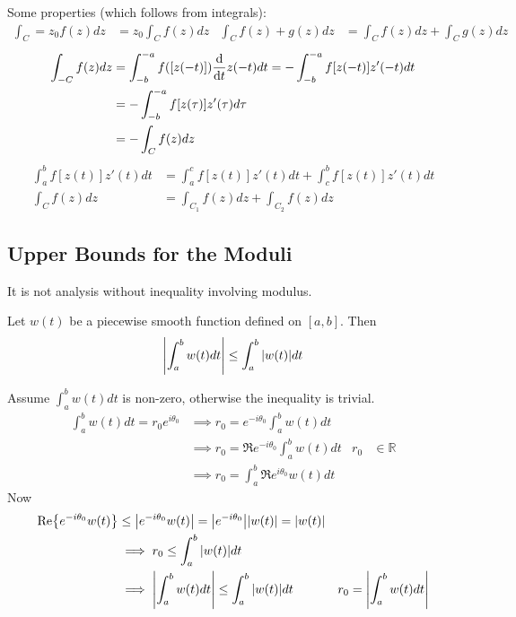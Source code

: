 \documentclass[12pt, english]{book}
\makeatletter
\renewenvironment{proof}[1][\proofname]{\par
	\pushQED{\qed}%
	\normalfont \topsep6\p@\@plus6\p@\relax
	\list{}{%
		\settowidth{\leftmargin}{\itshape\proofname:\hskip\labelsep}%
		\setlength{\labelwidth}{0pt}%
		\setlength{\itemindent}{-\leftmargin}%
	}%
	\item[\hskip\labelsep\itshape#1\@addpunct{:}]\ignorespaces
	}{ \popQED\endlist\@endpefalse}
\makeatother
\begin{document}
	Some properties (which follows from integrals):
	\begin{align*}
		\int_{C} = z_0 f(z) dz &= z_0 \int_{C} f(z) dz &
		\int_{C} f(z) + g(z) dz &= \int_{C} f(z) dz + \int_{C} g(z) dz 
	\end{align*}
	\begin{align*}
		\int_{-C} f(z) dz 
		&= \int_{-b}^{-a} f([z(-t)]) \dv{t} z(-t) dt = -\int_{-b}^{-a} f[z(-t)] z'(-t) dt \\
		&= -\int_{-b}^{-a} f[z(\tau)] z'(\tau) d\tau \\
		&= -\int_{C} f(z) dz
	\end{align*}
	\begin{align*}
		\int_{a}^{b} f[z(t)] z'(t) dt &= \int_{a}^{c} f[z(t)] z'(t) dt + \int_{c}^{b} f[z(t)] z'(t) dt\\
		\int_{C} f(z) dz &= \int_{C_1} f(z) dz + \int_{C_2} f(z) dz
	\end{align*}
	
	\subsection{Upper Bounds for the Moduli} \label{Upper Bounds for the Moduli Subsection - Complex}
	
	It is not analysis without inequality involving modulus.
	
	\begin{lemma}
		Let \(w(t)\) be a piecewise smooth function defined on \([a,b]\). Then
		\begin{align*}
			\abs{ \int_{a}^{b} w(t) dt} \leq \int_{a}^{b} \abs{w(t)} dt
		\end{align*}
	\end{lemma}
	\begin{proof}
		Assume \(\int_{a}^{b} w(t) dt\) is non-zero, otherwise the inequality is trivial. 
		\begin{align*}
			\int_{a}^{b} w(t) dt = r_0 e^{i\theta_0}
				&\implies r_0 = e^{-i\theta_0} \int_{a}^{b} w(t) dt\\
				&\implies r_0 = \Re{e^{-i\theta_0} \int_{a}^{b} w(t) dt} & r_0 &\in \mathbb{R} \\
				&\implies r_0 = \int_{a}^{b} \Re{e^{i\theta_0} w(t)} dt
		\end{align*}
		Now
		\begin{align*}
			\Re{e^{-i\theta_0} w(t)} 
			&\leq \abs{e^{-i\theta_0} w(t)} = \abs{e^{-i\theta_0}} \abs{w(t)} = \abs{w(t)} \\
			&\implies r_0 \leq \int_{a}^{b} \abs{w(t)} dt \\
			&\implies \abs{ \int_{a}^{b} w(t) dt} \leq \int_{a}^{b} \abs{w(t)} dt
				& r_0 = \abs{ \int_{a}^{b} w(t) dt}
		\end{align*}
	\end{proof}
	
\end{document}
